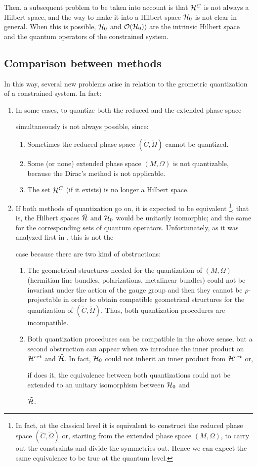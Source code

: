 \documentclass[12pt]{article}
\def\ben{\begin{enumerate}}
\def\een{\end{enumerate}}
\def\Hr{\tilde{\cal H}}
\def\He{{\cal H}^{ext}}
\def\Hc{{\cal H}^C}
\def\rps{(\tilde C,\tilde\Omega )}
\begin{document}
Then, a subsequent problem to be taken into account is that $\Hc$
is not always a Hilbert space, and the way to make it
into a Hilbert space ${\cal H}_0$ is not clear in general.
When this is possible, ${\cal H}_0$ and ${\cal O}({\cal H}_0))$
are the intrinsic Hilbert space and the quantum operators of the
constrained system.



\subsection{Comparison between methods}


In this way, several new problems arise in relation to the geometric
quantization
of a constrained system. In fact:
\begin{enumerate}
\item
In some cases, to quantize both the reduced and the extended phase space

simultaneously is not always possible, since:
\ben
\item
Sometimes the reduced phase space $\rps$ cannot be quantized.
\item
Some (or none) extended phase space $(M,\Omega )$ is not quantizable,
because the Dirac's method is not applicable.
\item
The set $\Hc$ (if it exists) is no longer a Hilbert space.
\een
\item
If both methods of quantization go on, it is expected to be equivalent
\footnote{
In fact, at the classical level it is equivalent to construct the
reduced phase space $\rps$
or, starting from the extended phase space $(M,\Omega )$,
to carry out the constraints and divide the symmetries out.
Hence we can expect the same equivalence to be true at the quantum
level.
},
that is, the Hilbert spaces $\Hr$ and ${\cal H}_0$ would be unitarily
isomorphic;
and the same for the corresponding sets of quantum operators.
Unfortunately, as it was analyzed first in \cite{AH-82}, this is not the

case
because there are two kind of obstructions:
\begin{enumerate}
\item
The geometrical structures needed for the quantization of $(M,\Omega )$
(hermitian line bundles, polarizations, metalinear bundles)
could not be invariant under the action of the gauge group and
then they cannot be $\rho$-projectable in order to obtain
compatible geometrical structures for the quantization of $\rps$.
Thus, both quantization procedures are incompatible.
\item
Both quantization procedures can be compatible in the above sense,
but a second obstruction can appear when we introduce
the inner product on $\He$ and $\Hr$.
In fact,  ${\cal H}_0$ could not inherit an inner product from $\He$ or,

if does it,
the equivalence between both quantizations
could not be extended to an unitary isomorphism between ${\cal H}_0$ and

$\Hr$.
\end{enumerate}
\end{enumerate}
\end{document}
